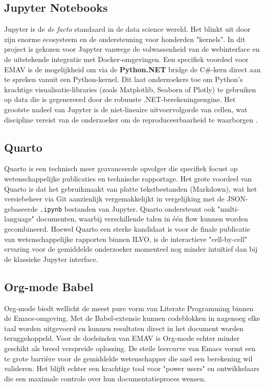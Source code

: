 \subsection{Jupyter Notebooks}
Jupyter \autocite{jupyternotebook} is de \textit{de facto} standaard in de data science wereld. Het blinkt uit door zijn enorme ecosysteem en de ondersteuning voor honderden "kernels". In dit project is gekozen voor Jupyter vanwege de volwassenheid van de webinterface en de uitstekende integratie met Docker-omgevingen. 
Een specifiek voordeel voor EMAV is de mogelijkheid om via de \textbf{Python.NET} bridge de C\#-kern direct aan te spreken vanuit een Python-kernel. Dit laat onderzoekers toe om Python's krachtige visualisatie-libraries (zoals Matplotlib, Seaborn of Plotly) te gebruiken op data die is gegenereerd door de robuuste .NET-berekeningsengine. Het grootste nadeel van Jupyter is de niet-lineaire uitvoervolgorde van cellen, wat discipline vereist van de onderzoeker om de reproduceerbaarheid te waarborgen \autocite{Rule2018}.
\subsection{Quarto}
Quarto \autocite{quarto2025} is een technisch meer geavanceerde opvolger die specifiek focust op wetenschappelijke publicaties en technische rapportage. Het grote voordeel van Quarto is dat het gebruikmaakt van platte tekstbestanden (Markdown), wat het versiebeheer via Git aanzienlijk vergemakkelijkt in vergelijking met de JSON-gebaseerde \texttt{.ipynb} bestanden van Jupyter. Quarto ondersteunt ook "multi-language" documenten, waarbij verschillende talen in één flow kunnen worden gecombineerd. Hoewel Quarto een sterke kandidaat is voor de finale publicatie van wetenschappelijke rapporten binnen ILVO, is de interactieve "cell-by-cell" ervaring voor de gemiddelde onderzoeker momenteel nog minder intuïtief dan bij de klassieke Jupyter interface.
\subsection{Org-mode Babel}
Org-mode \autocite{orgmode2025} biedt wellicht de meest pure vorm van Literate Programming binnen de Emacs-omgeving. Met de Babel-extensie kunnen codeblokken in nagenoeg elke taal worden uitgevoerd en kunnen resultaten direct in het document worden teruggekoppeld. Voor de doeleinden van EMAV is Org-mode echter minder geschikt als breed verspreide oplossing. De steile leercurve van Emacs vormt een te grote barrière voor de gemiddelde wetenschapper die snel een berekening wil valideren. Het blijft echter een krachtige tool voor "power users" en ontwikkelaars die een maximale controle over hun documentatieproces wensen.
